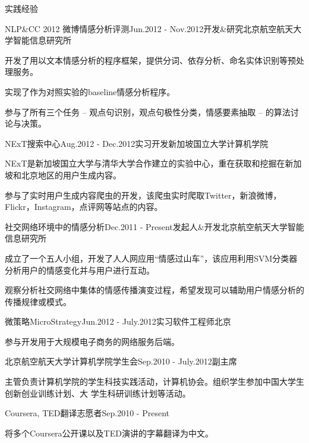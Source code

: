 \documentclass{resume} %
\begin{document}
\begin{rSection}{实践经验}

\begin{rSubsection}{NLP\&CC 2012 微博情感分析评测}{Jun.2012 - Nov.2012}{开发\&研究}{北京航空航天大学智能信息研究所}
\item 开发了用以文本情感分析的程序框架，提供分词、依存分析、命名实体识别等预处理服务。
\item 实现了作为对照实验的baseline情感分析程序。
\item 参与了所有三个任务 -- 观点句识别，观点句极性分类，情感要素抽取 -- 的算法讨论与决策。
\end{rSubsection}


\begin{rSubsection}{NExT搜索中心}{Aug.2012 - Dec.2012}{实习开发}{新加坡国立大学计算机学院}
\item NExT是新加坡国立大学与清华大学合作建立的实验中心，重在获取和挖掘在新加坡和北京地区的用户生成内容。
\item 参与了实时用户生成内容爬虫的开发，该爬虫实时爬取Twitter，新浪微博，Flickr，Instagram，点评网等站点的内容。
\end{rSubsection}


\begin{rSubsection}{社交网络环境中的情感分析}{Dec.2011 - Present}{发起人\&开发}{北京航空航天大学智能信息研究所}
\item 成立了一个五人小组，开发了人人网应用“情感过山车”，该应用利用SVM分类器分析用户的情感变化并与用户进行互动。
\item 观察分析社交网络中集体的情感传播演变过程，希望发现可以辅助用户情感分析的传播规律或模式。
\end{rSubsection}


\begin{rSubsection}{微策略MicroStrategy}{Jun.2012 - July.2012}{实习软件工程师}{北京}
\item 参与开发用于大规模电子商务的网络服务后端。
\end{rSubsection}

\begin{rSubsection}{北京航空航天大学计算机学院学生会}{Sep.2010 - July.2012}{副主席}{}
\item 主管负责计算机学院的学生科技实践活动，计算机协会。组织学生参加中国大学生创新创业训练计划、大
学生科研训练计划等活动。
\end{rSubsection}

\begin{rSubsection}{Coursera, TED翻译志愿者}{Sep.2010 - Present}{}{}
\item 将多个Coursera公开课以及TED演讲的字幕翻译为中文。
\end{rSubsection}

\end{rSection}
\end{document}
